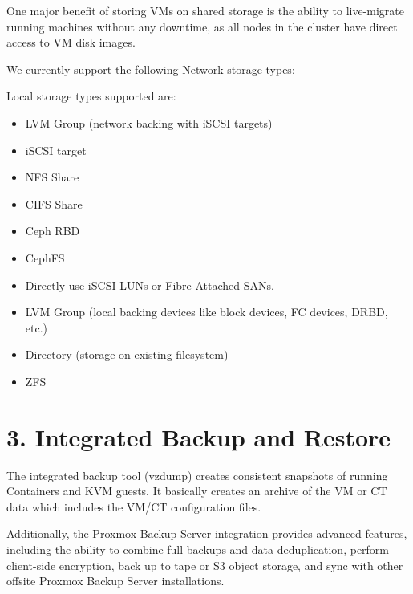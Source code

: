 One major benefit of storing VMs on shared storage is the ability to live-migrate running machines without any downtime, as all nodes in the cluster have direct access to VM disk images.

We currently support the following Network storage types:

Local storage types supported are:

\begin{itemize}[leftmargin=2cm]

	\item LVM Group (network backing with iSCSI targets)

	\item iSCSI target

	\item NFS Share

	\item CIFS Share

	\item Ceph RBD

	\item CephFS

	\item Directly use iSCSI LUNs or Fibre Attached SANs.

\end{itemize}

\begin{itemize}[leftmargin=2cm]

	\item LVM Group (local backing devices like block devices, FC devices, DRBD, etc.)

	\item Directory (storage on existing filesystem)

	\item ZFS

\end{itemize}


\section{3. Integrated Backup and Restore}

The integrated backup tool (vzdump) creates consistent snapshots of running Containers and KVM guests. It basically creates an archive of the VM or CT data which includes the VM/CT configuration files.

Additionally, the Proxmox Backup Server integration provides advanced features, including the ability to combine full backups and data deduplication, perform client-side encryption, back up to tape or S3 object storage, and sync with other offsite Proxmox Backup Server installations.


